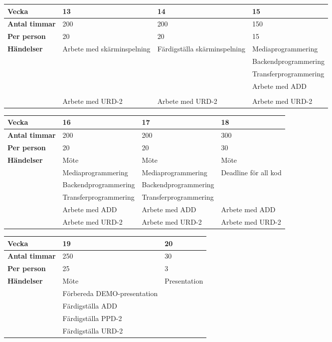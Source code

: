 \begin{tabular}{ | p{65pt} || p{110pt} | p{110pt} | p{110pt} |}
  \hline
  \textbf{Vecka} & 13 & 14 & 15  \\ \hline
  \textbf{Antal timmar} & 200 & 200 & 150 \\ \hline
  \textbf{Per person} & 20 & 20 & 15 \\ \hline
  \textbf{Händelser} & Arbete med skärminspelning & Färdigställa skärminspelning & Mediaprogrammering \\ \hline
  &  &  & Backendprogrammering \\ \hline
  &  &  & Transferprogrammering \\ \hline
  &  &  & Arbete med ADD \\ \hline
  &  &  &  \\ \hline
  & Arbete med URD-2 & Arbete med URD-2 & Arbete med URD-2\\ \hline
\end{tabular}

\begin{tabular}{ | p{65pt} || p{110pt} | p{110pt} | p{110pt} |}
  \hline
  \textbf{Vecka} & 16 & 17 & 18  \\ \hline
  \textbf{Antal timmar} & 200 & 200 & 300 \\ \hline
  \textbf{Per person} & 20 & 20 & 30 \\ \hline
  \textbf{Händelser} & Möte & Möte & Möte \\ \hline
  & Mediaprogrammering & Mediaprogrammering & Deadline för all kod \\ \hline
  & Backendprogrammering & Backendprogrammering &  \\ \hline
  & Transferprogrammering & Transferprogrammering &  \\ \hline
  & Arbete med ADD & Arbete med ADD & Arbete med ADD \\ \hline
  & Arbete med URD-2 & Arbete med URD-2 & Arbete med URD-2\\ \hline
\end{tabular}

\begin{tabular}{ | p{65pt} || p{110pt} | p{233pt} |}
  \hline
  \textbf{Vecka} & 19 & 20 \\ \hline
  \textbf{Antal timmar} & 250 & 30 \\ \hline
  \textbf{Per person} & 25 & 3 \\ \hline
  \textbf{Händelser} & Möte & Presentation\\ \hline
  & Förbereda DEMO-presentation &\\ \hline
  & Färdigställa ADD &\\ \hline
  & Färdigställa PPD-2 &\\ \hline
  & Färdigställa URD-2 &\\ \hline
\end{tabular}

